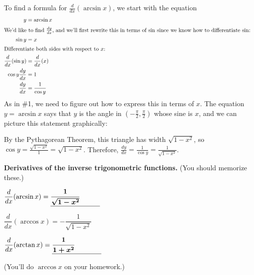 \documentclass[main]{subfiles}
\begin{document}
\begin{enumerate}
  \begin{solution}
    To find a formula for $\frac{d}{dx} (\arcsin x)$, we start with the
    equation
    \begin{align*}
      y &= \arcsin x \\
      \intertext{We'd like to find $\frac{dy}{dx}$, and we'll first
        rewrite this in terms of $\sin$ since we know how to differentiate
        $\sin$:}
      \sin y &= x \\
      \shortintertext{Differentiate both sides with respect to $x$:}
      \frac{d}{dx} (\sin y) &= \frac{d}{dx} (x) \\
      \cos y \frac{dy}{dx} &= 1 \\
      \frac{dy}{dx} &= \frac{1}{\cos y}
    \end{align*}
    As in {{\#1}}, we need to figure out how to express
    this in terms of $x$.  The equation $y = \arcsin x$ says that $y$ is
    the angle in $\left( - \frac{\pi}{2}, \frac{\pi}{2} \right)$ whose
    sine is $x$, and we can picture this statement graphically:
    \begin{center}
    \end{center}
    By the Pythagorean Theorem, this triangle has width $\sqrt{1 - x^2}$,
    so $\cos y = \frac{\sqrt{1 - x^2}}{1} = \sqrt{1 - x^2}$.  Therefore,
    $\displaystyle \frac{dy}{dx} = \frac{1}{\cos y} =
    \boxed{\frac{1}{\sqrt{1-x^2}}}$.
  \end{solution}

\end{enumerate}

  \begin{framed}
    \textbf{Derivatives of the inverse trigonometric functions.}  (You
    should memorize these.)
    
      $\displaystyle \frac{d}{dx} (\arcsin x) = \fitb{1in}{\displaystyle
        \frac{1}{\sqrt{1 - x^2}}}$

      $\dfrac{d}{dx} (\arccos x) = - \dfrac{1}{\sqrt{1 - x^2}}$

      $\dfrac{d}{dx} (\arctan x) = \fitb{1in}{\displaystyle \frac{1}{1 +
          x^2}}$

    (You'll do $\arccos x$ on your homework.)
  \end{framed}
\end{document}
